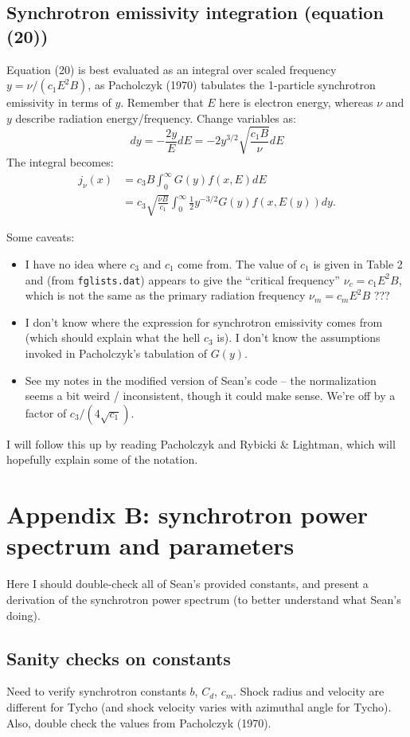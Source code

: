 \documentclass[10pt]{article}
\begin{document}
\subsection*{Synchrotron emissivity integration (equation (20))}

Equation (20) is best evaluated as an integral over scaled frequency
$y = \nu / (c_1 E^2 B)$, as Pacholczyk (1970) tabulates the 1-particle
synchrotron emissivity in terms of $y$.  Remember that $E$ here is electron
energy, whereas $\nu$ and $y$ describe radiation energy/frequency.
Change variables as:
\[
    dy = -\frac{2y}{E} dE = -2 y^{3/2} \sqrt{\frac{c_1 B}{\nu}} dE
\]
The integral becomes:
\begin{align*}
    j_\nu(x) &= c_3 B \int_0^\infty G(y) f(x,E) dE \\
             &= c_3 \sqrt{\frac{\nu B}{c_1}}
                \int_0^\infty \frac{1}{2} y^{-3/2} G(y) f(x,E(y)) dy\text{.}
\end{align*}

Some caveats:
\begin{itemize}
    \item I have no idea where $c_3$ and $c_1$ come from.  The value of $c_1$
        is given in Table 2 and (from {\tt fglists.dat}) appears to give the
        ``critical frequency'' $\nu_c = c_1 E^2 B$, which is not the same as
        the primary radiation frequency $\nu_m = c_m E^2 B$ ???
    \item I don't know where the expression for synchrotron emissivity comes
        from (which should explain what the hell $c_3$ is).  I don't know the
        assumptions invoked in Pacholczyk's tabulation of $G(y)$.
    \item See my notes in the modified version of Sean's code -- the
        normalization seems a bit weird / inconsistent, though it could make
        sense.  We're off by a factor of $c_3 / (4 \sqrt{c_1})$.
\end{itemize}

I will follow this up by reading Pacholczyk and Rybicki \& Lightman, which will
hopefully explain some of the notation.

\section*{Appendix B: synchrotron power spectrum and parameters}

Here I should double-check all of Sean's provided constants, and
present a derivation of the synchrotron power spectrum (to better understand
what Sean's doing).

\subsection*{Sanity checks on constants}

Need to verify synchrotron constants $b$, $C_d$, $c_m$.  Shock radius and
velocity are different for Tycho (and shock velocity varies with azimuthal
angle for Tycho).  Also, double check the values from Pacholczyk (1970).
\end{document}
